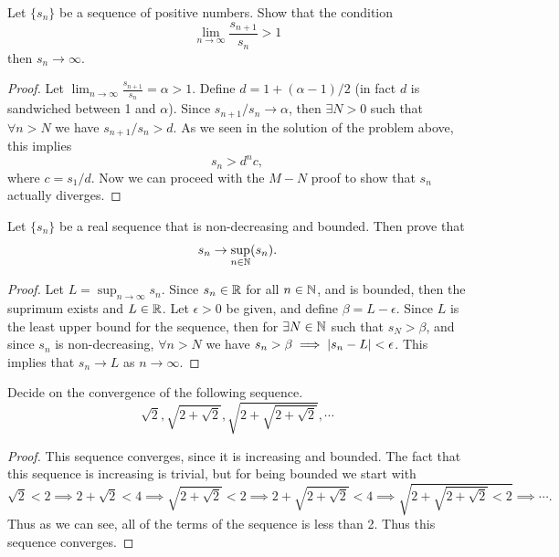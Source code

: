 \begin{problem}
	Let $\{s_n\}$ be a sequence of positive numbers. Show that the condition
	\[ \lim_{n\to\infty} \frac{s_{n+1}}{s_n} > 1 \]
	then $s_n \to \infty$.
\end{problem}

\begin{proof}
	Let $\lim_{n\to\infty} \frac{s_{n+1}}{s_n} = \alpha > 1$. Define $d = 1 + (\alpha - 1)/2$ (in fact $d$ is sandwiched between 1 and $\alpha$). Since $s_{n+1}/s_n \to \alpha$, then $\exists N>0$ such that $\forall n>N$ we have $s_{n+1}/s_n > d$. As we seen in the solution of the problem above, this implies 
	\[ s_n > d^n c, \]
	where $c = s_1/d$. Now we can proceed with the $M-N$ proof to show that $s_n$ actually diverges.
\end{proof}

\begin{problem}
	Let $\{s_n\}$ be a real sequence that is non-decreasing and bounded. Then prove that 
	\[ s_n \to \sup_{n\in\mathbb{N}}(s_n). \]
\end{problem}
\begin{proof}
	Let $L = \sup_{n\to \infty} s_n$. Since $s_n \in \mathbb{R}$ for all $n \in \mathbb{N}$, and is bounded, then the suprimum exists and $L \in \mathbb{R}$. Let $\epsilon>0$ be given, and define $\beta = L - \epsilon$. Since $L$ is the least upper bound for the sequence, then for $\exists N \in \mathbb{N}$ such that $s_N > \beta$, and since $s_n$ is non-decreasing, $\forall n>N$ we have $s_n > \beta \implies |s_n - L| < \epsilon$. This implies that $s_n \to L$ as $n\to\infty$.
\end{proof}

\begin{problem}
	Decide on the convergence of the following sequence.
	\[ \sqrt{2}, \sqrt{2+\sqrt{2}}, \sqrt{2+\sqrt{2+\sqrt{2}}}, \cdots \]
\end{problem}

\begin{proof}
	This sequence converges, since it is increasing and bounded. The fact that this sequence is increasing is trivial, but for being bounded we start with
	\[ \boxed{\sqrt{2}< 2}  \implies 2+\sqrt{2} < 4 \implies \boxed{\sqrt{2+\sqrt{2}} < 2} \implies 2+\sqrt{2+\sqrt{2}}<4 \implies \boxed{\sqrt{2+\sqrt{2+\sqrt{2}}<2}} \implies \cdots. \]
	Thus as we can see, all of the terms of the sequence is less than 2. Thus this sequence converges.
\end{proof}

